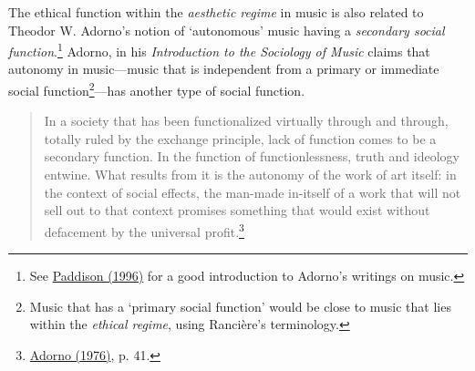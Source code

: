 The ethical function within the \emph{aesthetic regime} in music is also related to Theodor W. Adorno's notion of `autonomous' music having a \emph{secondary social function}.\footnote{See \hyperlink{paddison}{Paddison (1996)} for a good introduction to Adorno's writings on music.} Adorno, in his \emph{Introduction to the Sociology of Music} claims that autonomy in music---music that is independent from a primary or immediate social function\footnote{Music that has a `primary social function' would be close to music that lies within the \emph{ethical regime}, using Ranci\`{e}re's terminology.}---has another type of social function.
\begin{quote}
In a society that has been functionalized virtually through and through, totally ruled by the exchange principle, lack of function comes to be a secondary function. In the function of functionlessness, truth and ideology entwine. What results from it is the autonomy of the work of art itself: in the context of social effects, the man-made in-itself of a work that will not sell out to that context promises something that would exist without defacement by the universal profit.\footnote{\hyperlink{adornointro}{Adorno (1976)}, p. 41.}
\end{quote}
